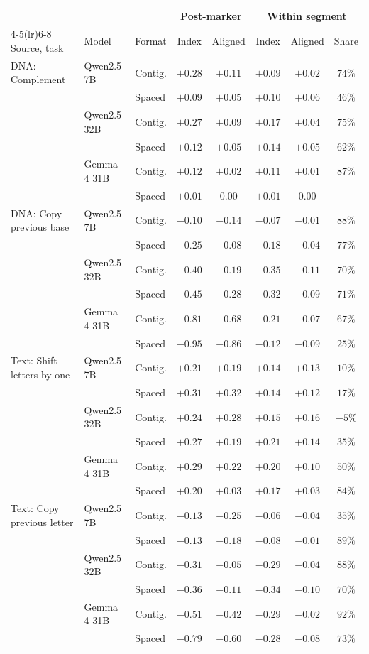 \begin{tabular}{lll cc ccc}
\toprule
& & & \multicolumn{2}{c}{Post-marker} & \multicolumn{3}{c}{Within segment} \\
\cmidrule(lr){4-5}\cmidrule(lr){6-8}
Source, task & Model & Format & Index & Aligned & Index & Aligned & Share \\
\midrule
DNA: Complement & Qwen2.5 7B & Contig. & $+0.28$ & $+0.11$ & $+0.09$ & $+0.02$ & $74\%$ \\
 &  & Spaced & $+0.09$ & $+0.05$ & $+0.10$ & $+0.06$ & $46\%$ \\
 & Qwen2.5 32B & Contig. & $+0.27$ & $+0.09$ & $+0.17$ & $+0.04$ & $75\%$ \\
 &  & Spaced & $+0.12$ & $+0.05$ & $+0.14$ & $+0.05$ & $62\%$ \\
 & Gemma 4 31B & Contig. & $+0.12$ & $+0.02$ & $+0.11$ & $+0.01$ & $87\%$ \\
 &  & Spaced & $+0.01$ & $0.00$ & $+0.01$ & $0.00$ & -- \\
\addlinespace
DNA: Copy previous base & Qwen2.5 7B & Contig. & $-0.10$ & $-0.14$ & $-0.07$ & $-0.01$ & $88\%$ \\
 &  & Spaced & $-0.25$ & $-0.08$ & $-0.18$ & $-0.04$ & $77\%$ \\
 & Qwen2.5 32B & Contig. & $-0.40$ & $-0.19$ & $-0.35$ & $-0.11$ & $70\%$ \\
 &  & Spaced & $-0.45$ & $-0.28$ & $-0.32$ & $-0.09$ & $71\%$ \\
 & Gemma 4 31B & Contig. & $-0.81$ & $-0.68$ & $-0.21$ & $-0.07$ & $67\%$ \\
 &  & Spaced & $-0.95$ & $-0.86$ & $-0.12$ & $-0.09$ & $25\%$ \\
\addlinespace
Text: Shift letters by one & Qwen2.5 7B & Contig. & $+0.21$ & $+0.19$ & $+0.14$ & $+0.13$ & $10\%$ \\
 &  & Spaced & $+0.31$ & $+0.32$ & $+0.14$ & $+0.12$ & $17\%$ \\
 & Qwen2.5 32B & Contig. & $+0.24$ & $+0.28$ & $+0.15$ & $+0.16$ & $-5\%$ \\
 &  & Spaced & $+0.27$ & $+0.19$ & $+0.21$ & $+0.14$ & $35\%$ \\
 & Gemma 4 31B & Contig. & $+0.29$ & $+0.22$ & $+0.20$ & $+0.10$ & $50\%$ \\
 &  & Spaced & $+0.20$ & $+0.03$ & $+0.17$ & $+0.03$ & $84\%$ \\
\addlinespace
Text: Copy previous letter & Qwen2.5 7B & Contig. & $-0.13$ & $-0.25$ & $-0.06$ & $-0.04$ & $35\%$ \\
 &  & Spaced & $-0.13$ & $-0.18$ & $-0.08$ & $-0.01$ & $89\%$ \\
 & Qwen2.5 32B & Contig. & $-0.31$ & $-0.05$ & $-0.29$ & $-0.04$ & $88\%$ \\
 &  & Spaced & $-0.36$ & $-0.11$ & $-0.34$ & $-0.10$ & $70\%$ \\
 & Gemma 4 31B & Contig. & $-0.51$ & $-0.42$ & $-0.29$ & $-0.02$ & $92\%$ \\
 &  & Spaced & $-0.79$ & $-0.60$ & $-0.28$ & $-0.08$ & $73\%$ \\
\bottomrule
\end{tabular}
